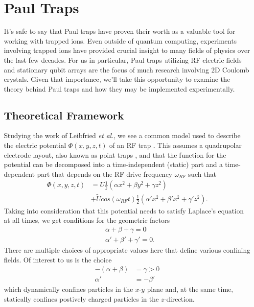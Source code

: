 \section{Paul Traps}
It's safe to say that Paul traps have proven their worth as a valuable tool for working with trapped ions. Even outside of quantum computing, experiments involving trapped ions have provided crucial insight to many fields of physics over the last few decades. For us in particular, Paul traps utilizing RF electric fields and stationary qubit arrays are the focus of much research involving 2D Coulomb crystals. Given that importance, we'll take this opportunity to examine the theory behind Paul traps and how they may be implemented experimentally.

\subsection{Theoretical Framework}
Studying the work of Leibfried \textit{et al.}, we see a common model used to describe the electric potential $\Phi(x, y, z, t)$ of an RF trap \cite{Leibfried}. This assumes a quadrupolar electrode layout, also known as point traps \cite{Bruzewicz}, and that the function for the potential can be decomposed into a time-independent (static) part and a time-dependent part that depends on the RF drive frequency $\omega_{RF}$ such that
\begin{align}
    \Phi(x, y, z, t) &= U \frac{1}{2}(\alpha x^2 + \beta y^2 + \gamma z^2)\\ 
    \nonumber&+ {\widetilde{U}} cos(\omega_{RF}t) \frac{1}{2}(\alpha' x^2 + \beta' x^2 + \gamma' z^2).
\end{align}
Taking into consideration that this potential needs to satisfy Laplace's equation at all times, we get conditions for the geometric factors
\begin{align}
    &\alpha + \beta + \gamma = 0\\
    \nonumber &\alpha' + \beta' + \gamma' = 0.
\end{align}
There are multiple choices of appropriate values here that define various confining fields. Of interest to us is the choice
\begin{align}
    -(\alpha + \beta) &= \gamma > 0\\
    \nonumber \alpha' &= -\beta'
\end{align}
which dynamically confines particles in the $x$-$y$ plane and, at the same time, statically confines postively charged particles in the $z$-direction.

